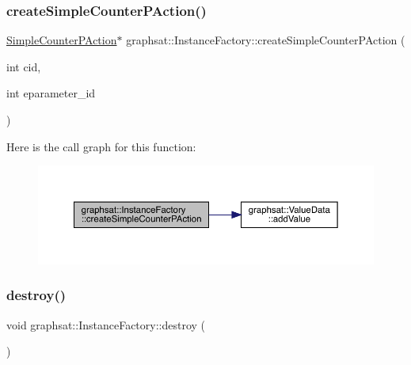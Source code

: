 \subsubsection{\texorpdfstring{createSimpleCounterPAction()}{createSimpleCounterPAction()}}
{\footnotesize\ttfamily \mbox{\hyperlink{classgraphsat_1_1_simple_counter_p_action}{Simple\+Counter\+P\+Action}}$\ast$ graphsat\+::\+Instance\+Factory\+::create\+Simple\+Counter\+P\+Action (\begin{DoxyParamCaption}\item[{int}]{cid,  }\item[{int}]{eparameter\+\_\+id }\end{DoxyParamCaption})\hspace{0.3cm}{\ttfamily [inline]}}

Here is the call graph for this function\+:
\nopagebreak
\begin{figure}[H]
\begin{center}
\leavevmode
\includegraphics[width=350pt]{classgraphsat_1_1_instance_factory_a1c7c11da85acdf5b5a1078a50b808f97_cgraph}
\end{center}
\end{figure}
\mbox{\label{classgraphsat_1_1_instance_factory_afae2681997d939f16abcbc0fb53866bd}} 
\subsubsection{\texorpdfstring{destroy()}{destroy()}}
{\footnotesize\ttfamily void graphsat\+::\+Instance\+Factory\+::destroy (\begin{DoxyParamCaption}{ }\end{DoxyParamCaption})\hspace{0.3cm}{\ttfamily [inline]}}

